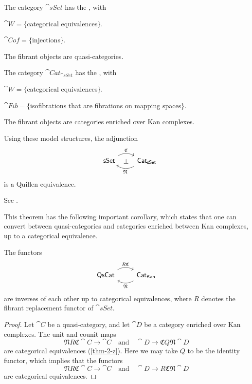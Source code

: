 \begin{theorem}\label{thm-4-e}
    The category $\cat{sSet}$ has the , with 
    \begin{itms}
        \item $\cat W=\{$categorical equivalences$\}$.
        \item $\cat{Cof}=\{$injections$\}$.
        \item The fibrant objects are quasi-categories.
    \end{itms}
    The category $\cat{Cat}_{\cat{sSet}}$ has the , with
    \begin{itms}
        \item $\cat W=\{$categorical equivalences$\}$.
        \item $\cat{Fib}=\{$isofibrations that are fibrations on mapping spaces$\}$.
        \item The fibrant objects are categories enriched over Kan complexes.
    \end{itms}
    Using these model structures, the adjunction
    \[\begin{tikzcd}
        \cat{sSet}\ar[r,bend left,"\mathfrak C"]\ar[r,phantom,"\bot"] &
        \rlap{$\cat{Cat}_{\cat{sSet}}$}\phantom{\cat{sSet}}\ar[l,bend left,"\mathfrak N"]
    \end{tikzcd}\]
    is a Quillen equivalence.
\end{theorem}

See \cite[Theorem~2.2.5.1]{htt}.

This theorem has the following important corollary,
which states that one can convert between quasi-categories 
and categories enriched between Kan complexes, up to 
a categorical equivalence.

\begin{corollary}
    The functors 
    \[\begin{tikzcd}
        \cat{QsCat}\ar[r,bend left,start anchor=north east,end anchor=north west,"R\mathfrak C"] &
        \cat{Cat}_{\cat{Kan}}\ar[l,bend left,start anchor=south west,end anchor=south east,"\mathfrak N"]
    \end{tikzcd}\]
    are inverses of each other up to categorical equivalences,
    where $R$ denotes the fibrant replacement functor of $\cat{sSet}$.
\end{corollary}

\begin{proof}
    Let $\cat C$ be a quasi-category, and let $\cat D$ be a category 
    enriched over Kan complexes. The unit and counit maps
    \[ \mathfrak NR\mathfrak C\cat C\to\cat C\quad\text{and}\quad\cat D\to\mathfrak CQ\mathfrak N\cat D \]
    are categorical equivalences (\ref{thm-2-z}).
    Here we may take $Q$ to be the identity functor, 
    which implies that the functors
    \[ \mathfrak NR\mathfrak C\cat C\to\cat C\quad\text{and}\quad\cat D\to R\mathfrak C\mathfrak N\cat D \]
    are categorical equivalences.
\end{proof}

